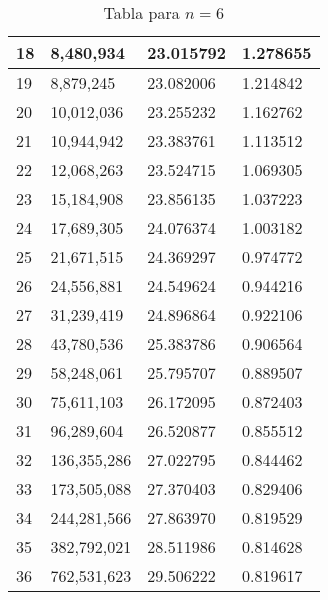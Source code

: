 \begin{table}[H]
{\begin{tabular}{| l | l | l | l |}
    18	&8,480,934	&23.015792	&1.278655 \\ \hline
    19	&8,879,245	&23.082006	&1.214842 \\ \hline
    20	&10,012,036	&23.255232	&1.162762 \\ \hline
    21	&10,944,942	&23.383761	&1.113512 \\ \hline
    22	&12,068,263	&23.524715	&1.069305 \\ \hline
    23	&15,184,908	&23.856135	&1.037223 \\ \hline
    24	&17,689,305	&24.076374	&1.003182 \\ \hline
    25	&21,671,515	&24.369297	&0.974772 \\ \hline
    26	&24,556,881	&24.549624	&0.944216 \\ \hline
    27	&31,239,419	&24.896864	&0.922106 \\ \hline
    28	&43,780,536	&25.383786	&0.906564 \\ \hline
    29	&58,248,061	&25.795707	&0.889507 \\ \hline
    30	&75,611,103	&26.172095	&0.872403 \\ \hline
    31	&96,289,604	&26.520877	&0.855512 \\ \hline
    32	&136,355,286	&27.022795	&0.844462 \\ \hline
    33	&173,505,088	&27.370403	&0.829406 \\ \hline
    34	&244,281,566	&27.863970	&0.819529 \\ \hline
    35	&382,792,021	&28.511986	&0.814628 \\ \hline
    36	&762,531,623	&29.506222	&0.819617 \\ \hline
  \end{tabular}
  \caption*{Tabla para $n=6$}
}
\end{table}

